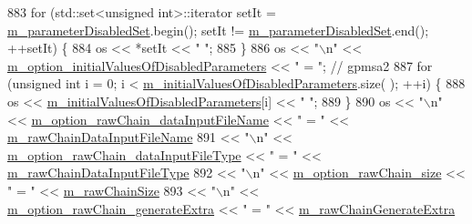 \begin{DoxyCode}
883   \textcolor{keywordflow}{for} (std::set<unsigned int>::iterator setIt = \hyperlink{class_q_u_e_s_o_1_1_m_l_sampling_level_options_a0c5c308a5b9e0150be59ad52a48e6ab9}{m\_parameterDisabledSet}.begin(); setIt
       != \hyperlink{class_q_u_e_s_o_1_1_m_l_sampling_level_options_a0c5c308a5b9e0150be59ad52a48e6ab9}{m\_parameterDisabledSet}.end(); ++setIt) \{
884     os << *setIt << \textcolor{stringliteral}{" "};
885   \}
886   os << \textcolor{stringliteral}{"\(\backslash\)n"} << \hyperlink{class_q_u_e_s_o_1_1_m_l_sampling_level_options_ab96236f77ecc1033bcdecbddced0c60f}{m\_option\_initialValuesOfDisabledParameters}       
         << \textcolor{stringliteral}{" = "}; \textcolor{comment}{// gpmsa2}
887   \textcolor{keywordflow}{for} (\textcolor{keywordtype}{unsigned} \textcolor{keywordtype}{int} i = 0; i < \hyperlink{class_q_u_e_s_o_1_1_m_l_sampling_level_options_a50cbdab5fe9fbda97aca16d206888a18}{m\_initialValuesOfDisabledParameters}.size(
      ); ++i) \{
888     os << \hyperlink{class_q_u_e_s_o_1_1_m_l_sampling_level_options_a50cbdab5fe9fbda97aca16d206888a18}{m\_initialValuesOfDisabledParameters}[i] << \textcolor{stringliteral}{" "};
889   \}
890   os << \textcolor{stringliteral}{"\(\backslash\)n"} << \hyperlink{class_q_u_e_s_o_1_1_m_l_sampling_level_options_a58eff69f727ad1128029a0d6fc98e556}{m\_option\_rawChain\_dataInputFileName}                 << \textcolor{stringliteral}{"
       = "} << \hyperlink{class_q_u_e_s_o_1_1_m_l_sampling_level_options_a192498743c73fa9244c8652530beebb2}{m\_rawChainDataInputFileName}
891      << \textcolor{stringliteral}{"\(\backslash\)n"} << \hyperlink{class_q_u_e_s_o_1_1_m_l_sampling_level_options_a530bd244a5f0e9ef40f9be18ec2dae49}{m\_option\_rawChain\_dataInputFileType}                 << \textcolor{stringliteral}{"
       = "} << \hyperlink{class_q_u_e_s_o_1_1_m_l_sampling_level_options_af216317de1aba551bfddd2be38e26898}{m\_rawChainDataInputFileType}
892      << \textcolor{stringliteral}{"\(\backslash\)n"} << \hyperlink{class_q_u_e_s_o_1_1_m_l_sampling_level_options_a21f76f865e40198fc83406f617e396c1}{m\_option\_rawChain\_size}                              << \textcolor{stringliteral}{" = "} << 
      \hyperlink{class_q_u_e_s_o_1_1_m_l_sampling_level_options_a8ab85efacd9881ab35b9f01b6e4fc5a3}{m\_rawChainSize}
893      << \textcolor{stringliteral}{"\(\backslash\)n"} << \hyperlink{class_q_u_e_s_o_1_1_m_l_sampling_level_options_a775bb8dfb4e5f2a0069667586eb1b336}{m\_option\_rawChain\_generateExtra}                     << \textcolor{stringliteral}{" = "}
       << \hyperlink{class_q_u_e_s_o_1_1_m_l_sampling_level_options_ab0dda87d92a759b277d07157def23174}{m\_rawChainGenerateExtra}

\end{DoxyCode}
